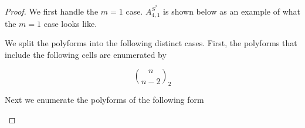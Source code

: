 \documentclass[12pt]{article}
\theoremstyle{plain}
\theoremstyle{definition}
\theoremstyle{remark}
\theoremstyle{definition}
\newcommand{\cellw}[4]{\draw[thick] ( #1 , #2 ) rectangle ( #3 , #4 );}
\newcommand{\cellb}[4]{\filldraw[black!60] ( #1 , #2 ) rectangle ( #3 , #4 ); \draw[thick] ( #1 , #2 ) rectangle ( #3 , #4 );}
\begin{document}
\begin{proof}

We first handle the $m=1$ case. $A^{S^*}_{4,1}$ is shown below as an example of what the $m=1$ case looks like.

\begin{center}
\end{center}

We split the polyforms into the following distinct cases. First, the polyforms that include the following cells are enumerated by

\begin{center}
\end{center}

$$\binom{n}{n-2}_2$$

Next we enumerate the polyforms of the following form

\begin{center}
\end{center}


\end{proof}
\end{document}
